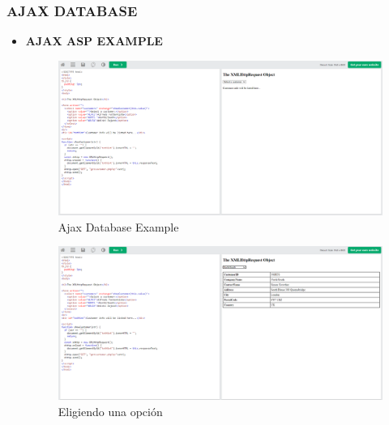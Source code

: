 \documentclass{article}
\begin{document}
	\subsubsection{AJAX DATABASE}
	\begin{itemize}
		\item \textbf{AJAX ASP EXAMPLE}
		\begin{figure}[H]
			\centering
			\includegraphics[width=1\textwidth,keepaspectratio]{img/ejemplo17.png}
			\caption{Ajax Database Example}
		\end{figure}
		\begin{figure}[H]
			\centering
			\includegraphics[width=1\textwidth,keepaspectratio]{img/seleccion1.png}
			\caption{Eligiendo una opción}
		\end{figure}
	\end{itemize}
	\newpage
\end{document}
